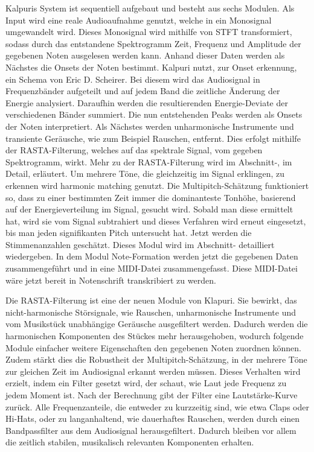 Kalpuris System ist sequentiell aufgebaut und besteht aus sechs Modulen.
Als Input wird eine reale Audioaufnahme genutzt, welche in ein Monosignal umgewandelt wird.
Dieses Monosignal wird mithilfe von STFT transformiert,
sodass durch das entstandene Spektrogramm Zeit,
Frequenz und Amplitude der gegebenen Noten ausgelesen werden kann.
Anhand dieser Daten werden als Nächstes die Onsets der Noten bestimmt.
Kalpuri nutzt, zur Onset erkennung, ein Schema von Eric D. Scheirer.
\cite{scheirer1998tempo}
Bei diesem wird das Audiosignal in Frequenzbänder aufgeteilt und
auf jedem Band die zeitliche Änderung der Energie analysiert.
Daraufhin werden die resultierenden Energie-Deviate der verschiedenen Bänder summiert.
Die nun entstehenden Peaks werden als Onsets der Noten interpretiert.
Als Nächstes werden unharmonische Instrumente und transiente Geräusche, wie zum Beispiel Rauschen, entfernt.
Dies erfolgt mithilfe der RASTA-Filterung, welches auf das spektrale Signal, vom gegeben Spektrogramm, wirkt.
Mehr zu der RASTA-Filterung wird im Abschnitt-, im Detail, erläutert.
Um mehrere Töne, die gleichzeitig im Signal erklingen, zu erkennen wird harmonic matching genutzt.
Die Multipitch-Schätzung funktioniert so, dass zu einer bestimmten Zeit immer die dominanteste Tonhöhe,
basierend auf der Energieverteilung im Signal, gesucht wird.
Sobald man diese ermittelt hat, wird sie vom Signal subtrahiert und dieses Verfahren wird erneut eingesetzt,
bis man jeden signifikanten Pitch untersucht hat.
Jetzt werden die Stimmenanzahlen geschätzt.
Dieses Modul wird im Abschnitt- detailliert wiedergeben.
In dem Modul Note-Formation werden jetzt die gegebenen Daten zusammengeführt und in eine MIDI-Datei zusammengefasst.
Diese MIDI-Datei wäre jetzt bereit in Notenschrift transkribiert zu werden.

\begin{description}[style=nextline]
\item[RASTA-Filterung]\label{itm:rasta}
Die RASTA-Filterung ist eine der neuen Module von Klapuri.
Sie bewirkt, das nicht-harmonische Störsignale, wie
Rauschen, unharmonische Instrumente und vom Musikstück unabhängige Geräusche ausgefiltert werden.
Dadurch werden die harmonischen Komponenten des Stückes mehr herausgehoben,
wodurch folgende Module einfacher weitere Eigenschaften den gegebenen Noten zuordnen können.
Zudem stärkt dies die Robustheit der Multipitch-Schätzung,
in der mehrere Töne zur gleichen Zeit im Audiosignal erkannt werden müssen.
Dieses Verhalten wird erzielt, indem ein Filter gesetzt wird,
der schaut, wie Laut jede Frequenz zu jedem Moment ist.
Nach der Berechnung gibt der Filter eine Lautstärke-Kurve zurück.
Alle Frequenzanteile, die entweder zu kurzzeitig sind, wie etwa Claps oder Hi-Hats, oder zu langanhaltend,
wie dauerhaftes Rauschen, werden durch einen Bandpassfilter aus dem Audiosignal herausgefiltert.
Dadurch bleiben vor allem die zeitlich stabilen, musikalisch relevanten Komponenten erhalten.
\end{description}

